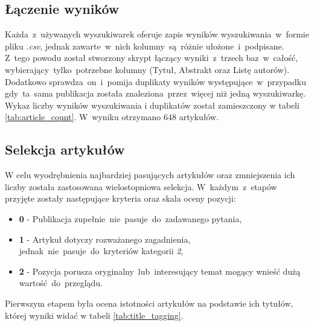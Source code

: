 \subsection{Łączenie wyników}
Każda~z~używanych wyszukiwarek oferuje zapis wyników wyszukiwania~w~formie pliku {\it .csv}, jednak zawarte~w~nich kolumny~są~różnie ułożone~i~podpisane. Z~tego powodu został stworzony skrypt łączący wyniki~z~trzech baz~w~całość, wybierający~tylko~potrzebne kolumny (Tytuł, Abstrakt oraz Listę autorów). Dodatkowo sprawdza~on~i~pomija duplikaty wyników występujące~w~przypadku gdy~ta~sama publikacja została znaleziona~przez~więcej niż jedną wyszukiwarkę. Wykaz liczby wyników wyszukiwania i duplikatów został zamieszczony w tabeli \ref{tab:article_count}. W~wyniku otrzymano 648 artykułów.

\subsection{Selekcja artykułów}
W celu wyodrębnienia najbardziej pasujących artykułów oraz zmniejszenia ich liczby została zastosowana wielostopniowa selekcja. W~każdym~z~etapów przyjęte zostały następujące kryteria oraz skala oceny pozycji:
\begin{itemize}
    \item {\bf 0} - Publikacja zupełnie~nie~pasuje~do~zadawanego pytania,
    \item {\bf 1} - Artykuł dotyczy rozważanego zagadnienia, jednak~nie~pasuje~do~kryteriów kategorii {\it 2},
    \item {\bf 2} - Pozycja porusza oryginalny~lub~interesujący temat mogący wnieść dużą wartość~do~przeglądu.
\end{itemize}

\noindent Pierwszym etapem była ocena istotności artykułów na podstawie ich tytułów, której wyniki widać w tabeli \ref{tab:title_tagging}.

